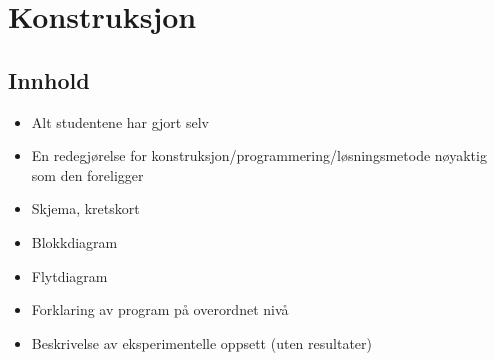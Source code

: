 \chapter{Konstruksjon}
\label{konstruksjon} %
\section{Innhold}
\begin{itemize}
    \item Alt studentene har gjort selv
    \item En redegjørelse for konstruksjon/programmering/løsningsmetode nøyaktig som den foreligger
    \item Skjema, kretskort
    \item Blokkdiagram
    \item Flytdiagram
    \item Forklaring av program på overordnet nivå
    \item Beskrivelse av eksperimentelle oppsett (uten resultater)
\end{itemize}